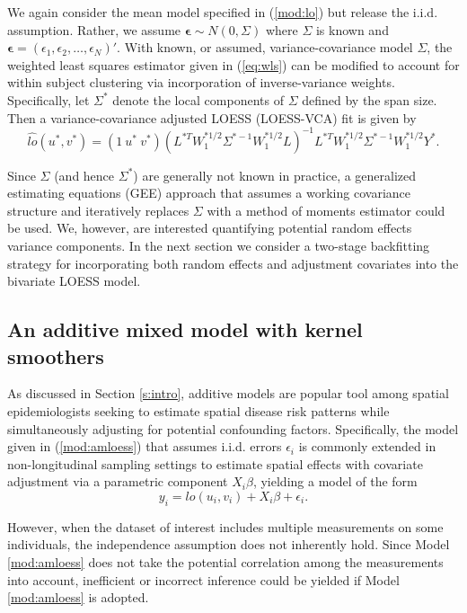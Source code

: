 	We again consider the mean model specified in (\ref{mod:lo}) but release the i.i.d. assumption. Rather, we assume $\mathbf{\epsilon} \sim N(0,\Sigma)$ where $\Sigma$ is known and $\mathbf{\epsilon}=(\epsilon_1,\epsilon_2,\dots,\epsilon_N)'$. With known, or assumed, variance-covariance model $\Sigma$, the weighted least squares estimator given in (\ref{eq:wls}) can be modified to account for within subject clustering via incorporation of inverse-variance weights. Specifically, let $\Sigma^*$ denote the local components of $\Sigma$ defined by the span size.  Then a variance-covariance adjusted LOESS (LOESS-VCA) fit is given by
	\begin{equation} \label{eq:wlsgls}
	\hat{lo}(u^*,v^*)=(1\ u^*\ v^*)(L^{*T}W_1^{*1/2}\Sigma^{*-1}W_1^{*1/2}L)^{-1}L^{*T}W_1^{*1/2}\Sigma^{*-1}W_1^{*1/2}Y^*.
	\end{equation}
	
	Since $\Sigma$ (and hence $\Sigma^*$) are generally not known in practice, a generalized estimating equations (GEE) approach \citep{liang1986longitudinal} that assumes a working covariance structure and iteratively replaces $\Sigma$ with a method of moments estimator could be used.  We, however, are interested quantifying potential random effects variance components.  In the next section we consider a two-stage backfitting strategy for incorporating both random effects and adjustment covariates into the bivariate LOESS model.
	
	\subsection{An additive mixed model with kernel smoothers}
	As discussed in Section \ref{s:intro}, additive models are popular tool among spatial epidemiologists seeking to estimate spatial disease risk patterns while simultaneously adjusting for potential confounding factors. Specifically, the model given in (\ref{mod:amloess}) that assumes i.i.d. errors $\epsilon_i$ is commonly extended in non-longitudinal sampling settings to estimate  spatial effects with covariate adjustment via a parametric component $X_{i}\beta$, yielding a model of the form
	\begin{equation} \label{mod:amloess}
	y_{i}=lo(u_{i},v_{i})+X_{i}\beta+\epsilon_{i}.
	\end{equation}
	
	However, when the dataset of interest includes multiple measurements on some individuals, the independence assumption does not inherently hold. Since Model \ref{mod:amloess} does not take the potential correlation among the measurements into account, inefficient or incorrect inference could be yielded if Model \ref{mod:amloess} is adopted. 
	
